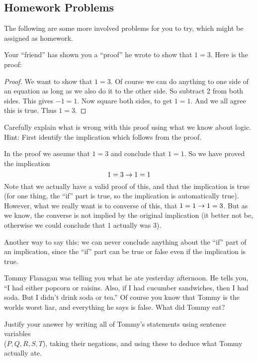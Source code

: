 

\subsection*{Homework Problems}

The following are some more involved problems for you to try, which might be assigned as homework.

\begin{questions}

\question Your ``friend'' has shown you a ``proof'' he wrote to show that $1 = 3$.  Here is the proof:

\begin{proof}
We want to show that $1 = 3$.  Of course we can do anything to one side of an equation as long as we also do it to the other side.  So subtract 2 from both sides.  This gives $-1 = 1$.  Now square both sides, to get $1 = 1$.  And we all agree this is true. Thus $1=3$.
\end{proof}

Carefully explain what is wrong with this proof using what we know about logic.  Hint: First identify the implication which follows from the proof.

\begin{solution}
In the proof we assume that $1=3$ and conclude that $1=1$.  So we have proved the implication
\[1=3 \rightarrow 1=1\]
Note that we actually have a valid proof of this, and that the implication is true (for one thing, the ``if'' part is true, so the implication is automatically true).  However, what we really want is to converse of this, that $1=1 \rightarrow 1=3$.  But as we know, the converse is not implied by the original implication (it better not be, otherwise we could conclude that 1 actually was 3).  

Another way to say this: we can never conclude anything about the ``if'' part of an implication, since the ``if'' part can be true or false even if the implication is true.
\end{solution}



\question Tommy Flanagan was telling you what he ate yesterday afternoon.  He tells you, ``I had either popcorn or raisins.  Also, if I had cucumber sandwiches, then I had soda.  But I didn't drink soda or tea.''  Of course you know that Tommy is the worlds worst liar, and everything he says is false.  What did Tommy eat?  

Justify your answer by writing all of Tommy's statements using sentence variables \\ ($P, Q, R, S, T$), taking their negations, and using these to deduce what Tommy actually ate.


\end{questions}
